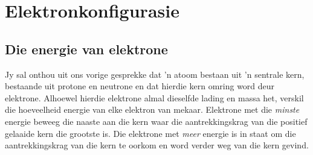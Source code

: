 \section{Elektronkonfigurasie}
\subsection*{Die energie van elektrone}
\nopagebreak
\label{m38741*id259210}
Jy sal onthou uit ons vorige gesprekke dat 'n atoom bestaan uit 'n sentrale kern, bestaande uit protone en neutrone en dat hierdie kern omring word deur elektrone. Alhoewel hierdie elektrone almal dieselfde lading en massa het, verskil die hoeveelheid energie van elke elektron van mekaar. Elektrone met die \textsl{minste} energie beweeg die naaste aan die kern waar die aantrekkingskrag van die positief gelaaide kern die grootste is. Die elektrone met \textsl{meer} energie is in staat om die aantrekkingskrag van die kern te oorkom en word verder weg van die kern gevind.\par 


      
